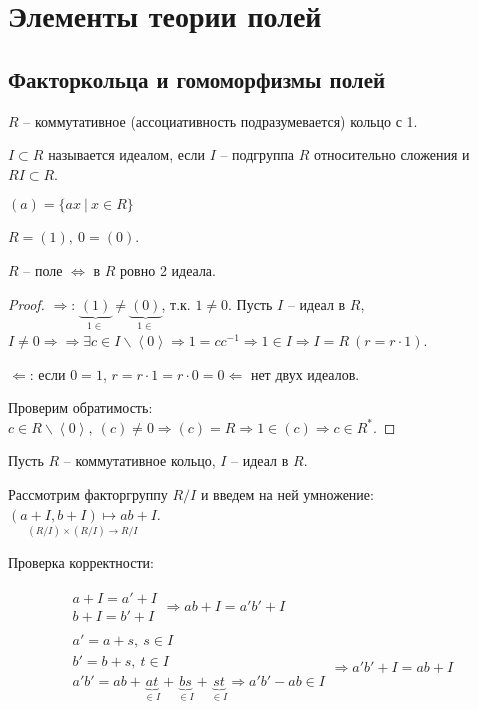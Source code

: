 \documentclass[main]{subfiles}
\begin{document}
\part{Элементы теории полей}

\chapter{Факторкольца и гомоморфизмы полей}

$R$ -- коммутативное (ассоциативность подразумевается) кольцо с 1. 

$I \subset R$ называется идеалом, если $I$ -- подгруппа $R$ относительно сложения и $RI \subset R$.

$(a) = \{ax \ |\ x \in R\}$

$R = (1), \ 0 = (0)$.

\begin{proposition}
    $R$ -- поле $\Leftrightarrow$ в $R$ ровно 2 идеала.
\end{proposition}

\begin{proof}
    $\Rightarrow$: $\underbrace{(1)}_{1 \in} \neq \underbrace{(0)}_{1 \in}$, т.к. $1 \neq 0$.
    Пусть $I$ -- идеал в $R$, $I \neq 0 \Rightarrow \Rightarrow \exists c \in I \backslash \left\langle 0\right\rangle
    \Rightarrow 1 = c c^{-1} \Rightarrow 1 \in I \Rightarrow I = R \ (r = r \cdot 1) $.

    $\Leftarrow$: если $0 = 1$, $r = r \cdot 1 = r \cdot 0 = 0 \Leftarrow$ нет двух идеалов.
    
    Проверим обратимость: $c \in R \backslash \left\langle 0\right\rangle, \ (c) \neq 0 \Rightarrow
    (c) = R \Rightarrow 1 \in (c) \Rightarrow c \in R^*$. 
\end{proof}

Пусть $R$ -- коммутативное кольцо, $I$ -- идеал в $R$.

Рассмотрим факторгруппу $R/I$ и введем на ней умножение: \\ $\underset{(R/I)\times(R/I) \rightarrow R/I}{(a+I, b+I) \mapsto ab+I}$.

Проверка корректности:

\begin{gather*}
    \begin{gathered}
        a + I = a' + I \\
        b + I = b' + I 
    \end{gathered} \Rightarrow ab +I = a'b' +I \\
    \begin{gathered}
        a'= a + s, \ s\in I \\
        b'= b + s, \ t\in I \\
        a'b' = ab + \underbrace{at}_{\in I} + \underbrace{bs}_{\in I} + \underbrace{st}_{\in I}  \Rightarrow a'b' - ab \in I
    \end{gathered} \Rightarrow a'b' + I = ab +I
\end{gather*}
\end{document}
